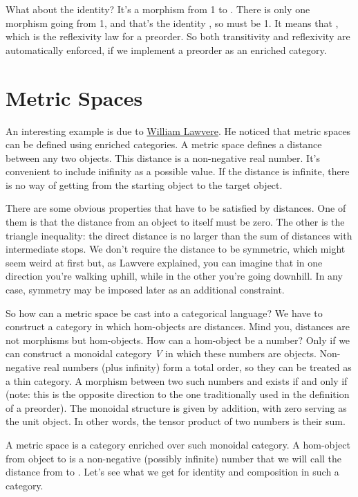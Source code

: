 What about the identity? It's a morphism from 1 to .
There is only one morphism going from 1, and that's the identity
, so  must be 1. It means that
, which is the reflexivity law for a
preorder. So both transitivity and reflexivity are automatically
enforced, if we implement a preorder as an enriched category.

\section{Metric Spaces}\label{metric-spaces}

An interesting example is due to
\href{http://www.tac.mta.ca/tac/reprints/articles/1/tr1.pdf}{William
Lawvere}. He noticed that metric spaces can be defined using enriched
categories. A metric space defines a distance between any two objects.
This distance is a non-negative real number. It's convenient to include
inifinity as a possible value. If the distance is infinite, there is no
way of getting from the starting object to the target object.

There are some obvious properties that have to be satisfied by
distances. One of them is that the distance from an object to itself
must be zero. The other is the triangle inequality: the direct distance
is no larger than the sum of distances with intermediate stops. We don't
require the distance to be symmetric, which might seem weird at first
but, as Lawvere explained, you can imagine that in one direction you're
walking uphill, while in the other you're going downhill. In any case,
symmetry may be imposed later as an additional constraint.

So how can a metric space be cast into a categorical language? We have
to construct a category in which hom-objects are distances. Mind you,
distances are not morphisms but hom-objects. How can a hom-object be a
number? Only if we can construct a monoidal category \emph{V} in which
these numbers are objects. Non-negative real numbers (plus infinity)
form a total order, so they can be treated as a thin category. A
morphism between two such numbers  and  exists if
and only if  (note: this is the opposite
direction to the one traditionally used in the definition of a
preorder). The monoidal structure is given by addition, with zero
serving as the unit object. In other words, the tensor product of two
numbers is their sum.

A metric space is a category enriched over such monoidal category. A
hom-object  from object  to  is a
non-negative (possibly infinite) number that we will call the distance
from  to . Let's see what we get for identity and
composition in such a category.

